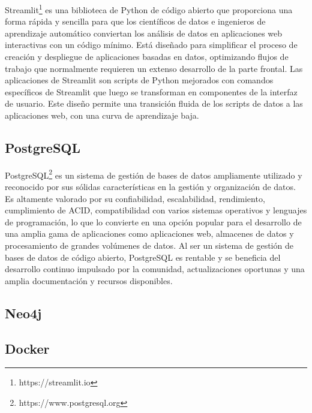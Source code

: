 Streamlit\footnote{https://streamlit.io} es una biblioteca de Python de código abierto que proporciona una forma rápida y sencilla para que los 
científicos de datos e ingenieros de aprendizaje automático conviertan los análisis de datos en aplicaciones web 
interactivas con un código mínimo. Está diseñado para simplificar el proceso de creación y despliegue de aplicaciones 
basadas en datos, optimizando flujos de trabajo que normalmente requieren un extenso desarrollo de la parte frontal. 
Las aplicaciones de Streamlit son scripts de Python mejorados con comandos específicos de Streamlit que luego se 
transforman en componentes de la interfaz de usuario. Este diseño 
permite una transición fluida de los scripts de datos a las aplicaciones web, con una curva de aprendizaje baja.


\subsection{PostgreSQL}

PostgreSQL\footnote{https://www.postgresql.org} es un sistema de gestión de bases de datos ampliamente utilizado y 
reconocido por sus sólidas 
características en la gestión y organización de datos. Es altamente valorado por su confiabilidad, escalabilidad, 
rendimiento, cumplimiento de ACID, compatibilidad con varios sistemas operativos y lenguajes de programación, lo que 
lo convierte en una opción popular para el desarrollo de una amplia gama de aplicaciones 
como aplicaciones web, 
almacenes de datos y procesamiento de grandes volúmenes de datos. 
Al ser un sistema de gesti\'on de bases de datos de código abierto, PostgreSQL es rentable y se beneficia del 
desarrollo continuo impulsado por la comunidad, actualizaciones oportunas y una amplia documentación y recursos 
disponibles.

\subsection{Neo4j}

\subsection{Docker}